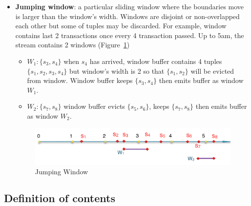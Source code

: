 \begin{itemize}
\item \textbf{Jumping window}: a particular sliding window where the boundaries move is larger than the window's width. Windows are disjoint or non-overlapped each other but some of tuples may be discarded. For example, window contains last 2 transactions once every 4 transaction passed. Up to 5am, the stream contains 2 windows (Figure~\ref{fig:jumpingWin})
\begin{itemize}
\item $W_1:\{s_3,s_4\}$ when $s_4$ has arrived, window buffer contains 4 tuples $\{s_1,s_2,s_3,s_4\}$ but window's width is 2 so that $\{s_1,s_2\}$ will be evicted from window. Window buffer keeps $\{s_3,s_4\}$ then emits buffer as window $W_1$.
\item $W_2:\{s_7, s_8\}$ window buffer evicts $\{s_5,s_6\}$, keeps $\{s_7,s_8\}$ then emits buffer as window $W_2$.
\end{itemize}

\begin{figure}[htbp!] 
\centering    
\includegraphics[width=1\textwidth]{jumpingWin}
\caption{Jumping Window}
\label{fig:jumpingWin}
\end{figure}


\end{itemize}


\subsection{Definition of contents} 

